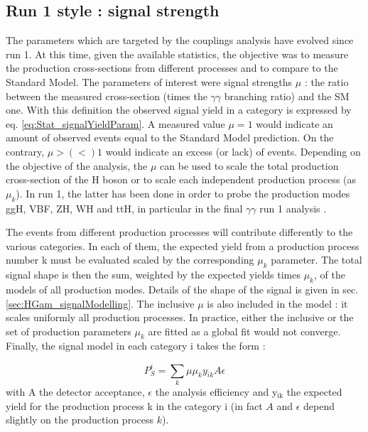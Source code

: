 \subsection{Run 1 style : signal strength}
\label{sec:org84ab396}
\label{sec:HGam_signalStrength}

The parameters which are targeted by the couplings analysis have evolved since run 1.
At this time, given the available statistics, the objective was to measure the production cross-sections from different processes and to compare to the Standard Model.
The parameters of interest were signal strengths $\mu$ : the ratio between the measured cross-section (times the $\gamma\gamma$ branching ratio) and the SM one.
With this definition the observed signal yield in a category is expressed by eq. \ref{eq:Stat_signalYieldParam}.
A measured value $\mu=1$ would indicate an amount of observed events equal to the Standard Model prediction.
On the contrary, $\mu>(<)1$ would indicate an excess (or lack) of events.
Depending on the objective of the analysis, the $\mu$ can be used to scale the total production cross-section of the H boson or to scale each independent production process (as $\mu_k$).
In run 1, the latter has been done in order to probe the production modes ggH, VBF, ZH, WH and ttH, in particular in the final \(\gamma\gamma\) run 1 analysis \cite{CERN-PH-EP-2014-198}.


The events from different production processes will contribute differently to the various categories.
In each of them, the expected yield from a production process number k must be evaluated scaled by the corresponding $\mu_k$ parameter.
The total signal shape is then the sum, weighted by the expected yields times $\mu_k$, of the models of all production modes.
Details of the shape of the signal is given in sec. \ref{sec:HGam_signalModelling}.
The inclusive $\mu$ is also included in the model : it scales uniformly all production processes.
In practice, either the inclusive or the set of production parameters $\mu_k$ are fitted as a global fit would not converge.
Finally, the signal model in each category i takes the form :

\begin{equation}
  P_S^i = \sum\limits_{k} \mu \mu_{k} y_{ik} A \epsilon
  \label{eq:Stat_signalYieldParam}
\end{equation}
with A the detector acceptance, \(\epsilon\) the analysis efficiency and y\(_{\text{ik}}\) the expected yield for the production process k in the category i (in fact $A$ and $\epsilon$ depend slightly on the production process $k$).

